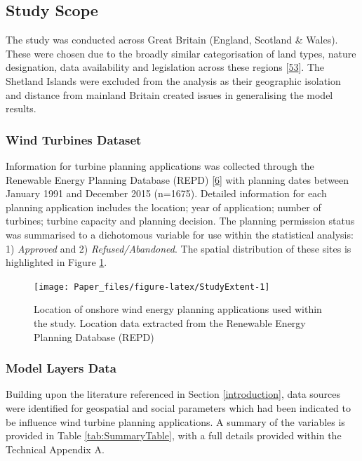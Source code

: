 \documentclass[a4paper,]{article}
\theoremstyle{definition}
\theoremstyle{definition}
\theoremstyle{definition}
\theoremstyle{remark}
\begin{document}
\subsection{Study Scope}\label{study-scope}

The study was conducted across Great Britain (England, Scotland \&
Wales). These were chosen due to the broadly similar categorisation of
land types, nature designation, data availability and legislation across
these regions {[}\protect\hyperlink{ref-HMGovernment2014}{53}{]}. The
Shetland Islands were excluded from the analysis as their geographic
isolation and distance from mainland Britain created issues in
generalising the model results.

\subsubsection{Wind Turbines Dataset}\label{wind-turbines-dataset}

Information for turbine planning applications was collected through the
Renewable Energy Planning Database (REPD)
{[}\protect\hyperlink{ref-DECC2016}{6}{]} with planning dates between
January 1991 and December 2015 (n=1675). Detailed information for each
planning application includes the location; year of application; number
of turbines; turbine capacity and planning decision. The planning
permission status was summarised to a dichotomous variable for use
within the statistical analysis: 1) \emph{Approved} and 2)
\emph{Refused/Abandoned}. The spatial distribution of these sites is
highlighted in Figure \ref{fig:StudyExtent}.

\begin{figure}[h]

{\centering \texttt{[image: Paper\_files/figure-latex/StudyExtent-1]} 

}

\caption{Location of onshore wind energy planning applications used within the study. Location data extracted from the Renewable Energy Planning Database (REPD)}\label{fig:StudyExtent}
\end{figure}

\subsubsection{Model Layers Data}\label{model-layers-data}

Building upon the literature referenced in Section \ref{introduction},
data sources were identified for geospatial and social parameters which
had been indicated to be influence wind turbine planning applications. A
summary of the variables is provided in Table \ref{tab:SummaryTable},
with a full details provided within the Technical Appendix A.
\end{document}
